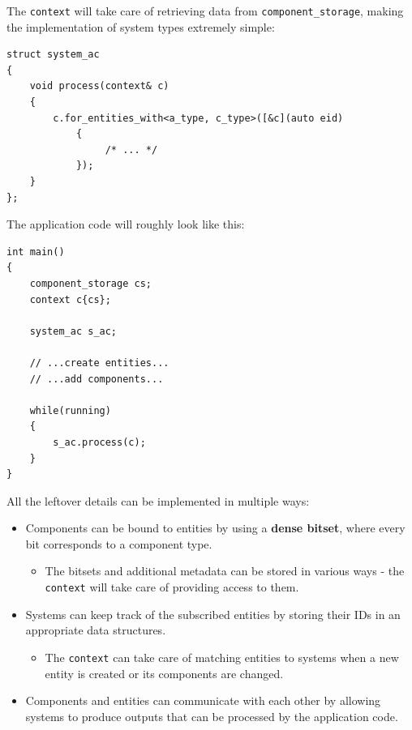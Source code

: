 \documentclass[twoside, 12pt, a4paper, openany]{book}
\providecommand{\tightlist}{%
  \setlength{\itemsep}{0pt}\setlength{\parskip}{0pt}}
\begin{document}
The
\texttt{context}
will take care of retrieving data from
\texttt{component_storage},
making the implementation of system types extremely simple:

\begin{verbatim}
struct system_ac
{
    void process(context& c)
    {
        c.for_entities_with<a_type, c_type>([&c](auto eid)
            {
                 /* ... */
            });
    }
};
\end{verbatim}

The application code will roughly look like this:

\begin{verbatim}
int main()
{
    component_storage cs;
    context c{cs};

    system_ac s_ac;

    // ...create entities...
    // ...add components...

    while(running)
    {
        s_ac.process(c);
    }
}
\end{verbatim}

All the leftover details can be implemented in multiple ways:

\begin{itemize}
\item
  Components can be bound to entities by using a \textbf{dense bitset},
  where every bit corresponds to a component type.

  \begin{itemize}
  \tightlist
  \item
    The bitsets and additional metadata can be stored in various ways -
    the
    \texttt{context}
    will take care of providing access to them.
  \end{itemize}
\item
  Systems can keep track of the subscribed entities by storing their IDs
  in an appropriate data structures.

  \begin{itemize}
  \tightlist
  \item
    The
    \texttt{context}
    can take care of matching entities to systems when a new entity is
    created or its components are changed.
  \end{itemize}
\item
  Components and entities can communicate with each other by allowing
  systems to produce outputs that can be processed by the application
  code.
\end{itemize}
\end{document}
